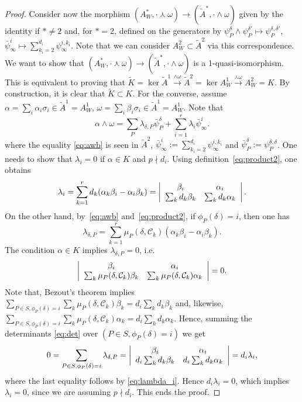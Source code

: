 \documentclass[11pt]{amsart}
\def\cC{\mathcal{C}}
\def\w{\omega}
\theoremstyle{plain}
\theoremstyle{definition}
\begin{document}
\begin{proof}
Consider now the morphism $(A^*_W,\cdot\curlywedge\w) \to  (\tilde A^*,\cdot\wedge\w)$
given by the identity if $* \neq 2$ and, for $*=2$, defined on the generators by
$\psi_P^\delta\wedge\psi_P^{\delta'} \mapsto \psi_P^{\delta,\delta'}$, 
$\bar \psi_\infty^i\mapsto \sum_{k_i=2}^{d_i}\psi_\infty^{i,k_i}$. 
Note that we can consider $A^2_W \subset \tilde A^2$ via this correspondence.
We want to show that
 $(A^*_W,\cdot\curlywedge\w) \to  (\tilde A^*,\cdot\wedge\w)$ is a 1-quasi-isomorphism.
 This is equivalent to proving that
$\tilde K=\ker \tilde A^1\xrightarrow{\wedge\omega}\tilde A^2=\ker A_W^1\xrightarrow{\curlywedge\omega}A_W^2=K$.
By construction, it is clear that $\tilde K\subset K$. For the converse, assume
$\alpha=\sum_{i} \alpha_i\sigma_i\in \tilde A^1=A^1_W$,
$\omega=\sum_i \beta_i\sigma_i\in \tilde A^1=A^1_W$. Note that
\begin{equation}
\label{eq:awb}
\alpha\wedge \omega=\sum_P \lambda_{\delta,P} \bar\psi_P^\delta + \sum_{i=1}^r \lambda_i \bar\psi^i_\infty.
\end{equation}
where the equality \eqref{eq:awb} is seen in $\tilde A^2$,  $\bar\psi^i_\infty:=\sum_{k_i=2}^{d_i}\psi^{i,k_i}_\infty$ and $\bar\psi_P^\delta := \psi_P^{\bar \delta, \delta}$.
One needs to show that $\lambda_i=0$ if $\alpha \in K$ and $p\nmid d_i$.
Using definition~\eqref{eq:product2}, one obtains
\begin{equation}
\label{eq:lambda_i}
    \lambda_i=\sum_{k=1}^r d_k(\alpha_k\beta_i-\alpha_i\beta_k)=
\left| \array{cc} \beta_i & \alpha_i \\ \sum_k d_k\beta_k & \sum_k d_k\alpha_k \endarray\right|.
\end{equation}
On the other hand, by~\eqref{eq:awb} and~\eqref{eq:product2}, if $\phi_P(\delta)=i$, then one has
$$
\lambda_{\delta,P}=\sum_{k=1}^r \mu_P(\delta,\cC_k)(\alpha_k\beta_i-\alpha_i\beta_k).
$$
The condition $\alpha \in K$ implies $\lambda_{\delta,P}=0$, i.e.
\begin{equation}
\label{eq:det}
\left| \array{cc} \beta_i & \alpha_i \\
\sum_k \mu_P(\delta,\cC_k)\beta_k & \sum_k \mu_P(\delta,\cC_k)\alpha_k \endarray \right|=0.
\end{equation}
Note that, Bezout's theorem implies $\sum_{P\in S,\phi_P(\delta)=i} \sum_k \mu_P(\delta,\cC_k)\beta_k = 
d_i \sum_k d_k \beta_k$ and, likewise, $\sum_{P\in S,\phi_P(\delta)=i} \sum_k \mu_P(\delta,\cC_k)\alpha_k =d_i \sum_k d_k \alpha_k$.
Hence, summing the determinants \eqref{eq:det} over $(P\in S,\phi_P(\delta)=i)$ we get
 $$0=\sum_{P\in S,\phi_P(\delta)=i}\lambda_{\delta,P}= \left| \array{cc} \beta_i & \alpha_i \\
 d_i \sum_k d_k \beta_k & d_i \sum_k d_k \alpha_k \endarray \right| = d_i\lambda_i,$$ where the last equality follows by \eqref{eq:lambda_i}. Hence $d_i\lambda_i=0$, which implies $\lambda_i=0$, since we are assuming $p\nmid d_i$.
This ends the proof.
\end{proof}
\end{document}
